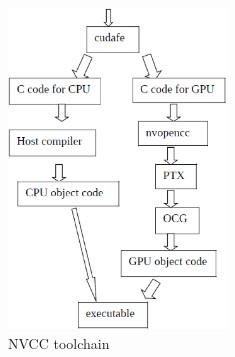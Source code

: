 \begin{figure}[hbt] \centerline{\includegraphics[height=8.5cm,
    angle=0]{./images/nvcc_toolchain.eps}}
\caption{NVCC toolchain}
\label{fig:nvcc-tool}
\end{figure}

